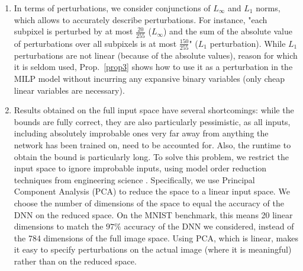 \begin{enumerate}
   \item  In terms of perturbations, we consider conjunctions of $L_\infty$ and $L_1$ norms, which allows to accurately describe perturbations. For instance, "each subpixel is perturbed by at most $\frac{20}{255}$ ($L_\infty$) and the sum of the absolute value of perturbations over all subpixels is at most $\frac{150}{255}$" ($L_1$ perturbation). While $L_1$ perturbations are not linear (because of the absolute values), reason for which it is seldom used, Prop.~\ref{prop3} shows how to use it as a perturbation in the MILP model without incurring any expansive binary variables (only cheap linear variables are necessary).

	\item Results obtained on the full input space have several shortcomings: while the bounds are fully correct, they are also particularly pessimistic, as all inputs, including absolutely improbable ones very far away from anything the network has been trained on, need to be accounted for. Also, the runtime to obtain the bound is particularly long. 
	To solve this problem, we restrict the input space to ignore improbable inputs, using model order reduction techniques from engineering science \cite{aiware}. Specifically, we use Principal Component Analysis (PCA) to reduce the space to a linear input space. We choose the number of dimensions of the space to equal the accuracy of the DNN on the reduced space. 
	On the MNIST benchmark, this means 20 linear dimensions to match the $97\%$ accuracy of the DNN we considered, instead of the 784 dimensions of the full image space. Using PCA, which is linear, makes it easy to specify perturbations on the actual image (where it is meaningful) rather than on the reduced space.


\end{enumerate}
